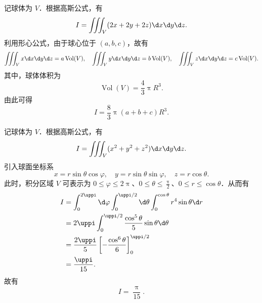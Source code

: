 \begin{solution}

    记球体为 $V$．根据高斯公式，有
    \begin{equation}
        \label{eq:part3-1}
        I = \iiint_V (2x + 2y + 2z) \d x \d y \d z.
    \end{equation}
    利用形心公式，由于球心位于 $(a, b, c)$，故有
    \begin{equation}
        \label{eq:part3-2}
        \iiint_V x \d x \d y \d z = a \operatorname{Vol}(V), \quad \iiint_V y \d x \d y \d z = b \operatorname{Vol}(V), \quad \iiint_V z \d x \d y \d z = c \operatorname{Vol}(V).
    \end{equation}
    其中，球体体积为
    \begin{equation}
        \label{eq:part3-3}
        \operatorname{Vol}(V) = \frac{4}{3} \uppi R^3.
    \end{equation}
    由此可得
    \begin{equation}
        \label{eq:part3-4}
        I = \boxed{\frac{8}{3} \uppi (a + b + c) R^3}.
    \end{equation}


    记球体为 $V$．根据高斯公式，有
    \begin{equation}
        \label{eq:part4-1}
        I = \iiint_V (x^2 + y^2 + z^2) \d x \d y \d z.
    \end{equation}
    引入球面坐标系
    \begin{equation}
        \label{eq:part4-2}
        x = r \sin \theta \cos \varphi, \quad y = r \sin \theta \sin \varphi, \quad z = r \cos \theta.
    \end{equation}
    此时，积分区域 $V$ 可表示为 $0 \le \varphi \le 2\uppi$、$0 \le \theta \le \frac{\uppi}{2}$、$0 \le r \le \cos \theta$．从而有
    \begin{equation}
        \label{eq:part4-3}
        \begin{aligned}
            I & = \int_0^{2\uppi} \d \varphi \int_0^{\uppi/2} \d \theta \int_0^{\cos \theta} r^4 \sin \theta \d r \\
              & = 2 \uppi \int_0^{\uppi/2} \frac{\cos^5 \theta}{5} \sin \theta \d \theta                          \\
              & = \frac{2 \uppi}{5} \left[ -\frac{\cos^6 \theta}{6} \right]_0^{\uppi/2}                           \\
              & = \frac{\uppi}{15}.
        \end{aligned}
    \end{equation}
    故有
    \begin{equation}
        \label{eq:part4-4}
        I = \boxed{\frac{\uppi}{15}}.
    \end{equation}


\end{solution}
